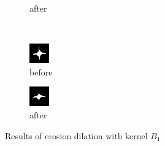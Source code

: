 \documentclass[12pt]{article}
\renewcommand{\subfiguresize}{.25\textwidth}
\begin{document}
\begin{figure}[H]
\begin{subfigure}[t]{\subfiguresize}
        \caption{after}
    \end{subfigure}\\[1em]
    \begin{subfigure}[t]{\subfiguresize}\centering
        \includegraphics[width=\textwidth]{img/image2.png}
        \caption{before}
    \end{subfigure}
    \hspace{2em}
    \begin{subfigure}[t]{\subfiguresize}\centering
        \includegraphics[width=\textwidth]{img/image2-erosion-b1.png}
        \caption{after}
    \end{subfigure}
    \caption{Results of erosion dilation with kernel $B_1$}
\end{figure} 
\end{document}
